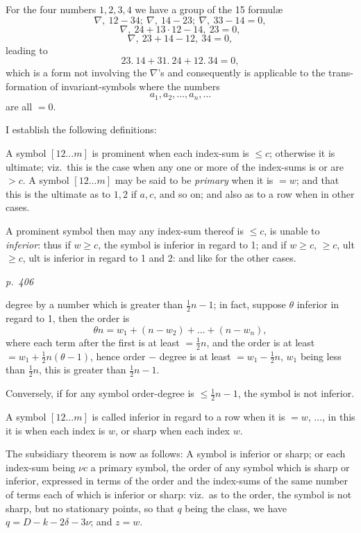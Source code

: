 \documentclass[11pt,a4paper]{article}
\theoremstyle{plain}
\theoremstyle{definition}
\begin{document}
For the four numbers $1, 2, 3, 4$ we have a group of the 15 formul\ae
\[
\nabla,\ 12 - 34;\ \nabla,\ 14 - 23;\ \nabla,\ 33 - 14 = 0,
\]
\[
\nabla,\ 24 + 13 \cdot 12 - 14,\ 23 = 0,
\]
\[
\nabla,\ 23 + 14 - 12,\ 34 = 0,
\]
leading to
\[
23.\ 14 + 31.\ 24 + 12.\ 34 = 0,
\]
which is a form not involving the $\nabla$'s and consequently is applicable to the trans-
formation of invariant-symbols where the numbers
\[
a_1, a_2, \ldots, a_n, \ldots
\]
are all $= 0$.

I establish the following definitions:

A symbol $[12 \ldots m]$ is prominent when each index-sum is $\leq c$; otherwise it is
ultimate; viz.\ this is the case when any one or more of the index-sums is or are $> c$.
A symbol $[12 \ldots m]$ may be said to be \textit{primary} when it is $= w$; and that this is the
ultimate as to $1, 2$ if $a, c$, and so on; and also as to a row when in other cases.

A prominent symbol then may any index-sum thereof is $\leq c$, is unable to
\textit{inferior}: thus if $w \geq c$, the symbol is inferior in regard to 1; and if $w \geq c$,
$\geq c$, ult $\geq c$, ult is inferior in regard to 1 and 2: and like for the other cases.

\clearpage

\bigskip
\textit{p.~406}
\smallskip

\noindent
degree by a number which is greater than $\frac{1}{2}n - 1$; in fact, suppose $\theta$ inferior in
regard to 1, then the order is
\[
\theta n = w_1 + (n - w_2) + \ldots + (n - w_n),
\]
where each term after the first is at least $= \frac{1}{2}n$, and the order is at least
$= w_1 + \frac{1}{2}n(\theta - 1)$, hence order $-$ degree is at least $= w_1 - \frac{1}{2}n$, $w_1$ being less than
$\frac{1}{2}n$, this is greater than $\frac{1}{2}n - 1$.

Conversely, if for any symbol order-degree is $\leq \frac{1}{2}n - 1$, the symbol is not
inferior.

A symbol $[12 \ldots m]$ is called inferior in regard to a row when it is $= w$, $\ldots$, in
this it is when each index is $w$, or sharp when each index $w$.

The subsidiary theorem is now as follows: A symbol is inferior or sharp; or
each index-sum being $\nu c$ a primary symbol, the order of any symbol which is sharp
or inferior, expressed in terms of the order and the index-sums of the same number of
terms each of which is inferior or sharp: viz.\ as to the order, the symbol is not sharp,
but no stationary points, so that $q$ being the class, we have $q = D - k - 2 \delta - 3 \nu$; and
$z = w$.
\end{document}
